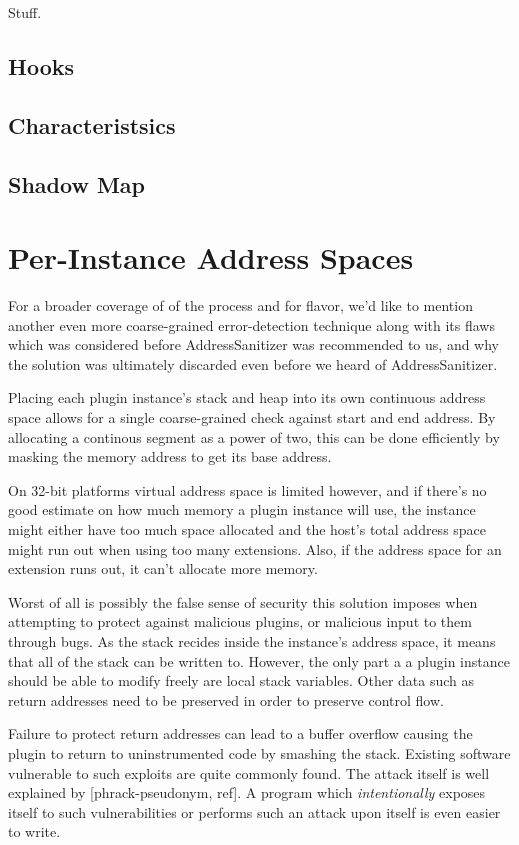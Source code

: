 Stuff.

\subsection {Hooks}

\subsection {Characteristsics}

\subsection {Shadow Map}


\section {Per-Instance Address Spaces}

For a broader coverage of of the process and for flavor, we'd like to mention
another even more coarse-grained error-detection technique along with its flaws
which was considered before AddressSanitizer was recommended to us, and why the
solution was ultimately discarded even before we heard of AddressSanitizer.

Placing each plugin instance's stack and heap into its own continuous address
space allows for a single coarse-grained check against start and end address. By
allocating a continous segment as a power of two, this can be done efficiently
by masking the memory address to get its base address.

On 32-bit platforms virtual address space is limited however, and if there's no
good estimate on how much memory a plugin instance will use, the instance might
either have too much space allocated and the host's total address space
might run out when using too many extensions. Also, if the address space for an
extension runs out, it can't allocate more memory.

Worst of all is possibly the false sense of security this solution imposes when
attempting to protect against malicious plugins, or malicious input to them
through bugs. As the stack recides inside the instance's address space, it means
that all of the stack can be written to. However, the only part a a plugin
instance should be able to modify freely are local stack variables. Other data
such as return addresses need to be preserved in order to preserve control flow.

Failure to protect return addresses can lead to a buffer overflow causing the
plugin to return to uninstrumented code by smashing the stack. Existing software
vulnerable to such exploits are quite commonly found. The attack itself is well
explained by  [phrack-pseudonym, ref]. A program which \emph{intentionally}
exposes itself to such vulnerabilities or performs such an attack upon itself is
even easier to write.
